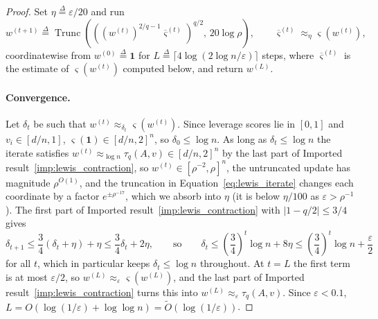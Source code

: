 \documentclass[11pt]{article}
\newcommand{\Trunc}{\operatorname{Trunc}}
\renewcommand{\O}{\widetilde O}
\newcommand{\defeq}{\stackrel{\Delta}{=}}
\begin{document}
\begin{proof}
Set $\eta \defeq \varepsilon / 20$ and run
\begin{equation}
\label{eq:lewis_iterate}
w^{(t + 1)}
\defeq
\Trunc\left(
\left( \left( w^{(t)} \right)^{2/q - 1} \overline{\varsigma}^{(t)} \right)^{q/2},
\, 20 \log \rho \right),
\qquad
\overline{\varsigma}^{(t)} \approx_{\eta} \varsigma\left( w^{(t)} \right),
\end{equation}
coordinatewise from $w^{(0)} \defeq \mathbf{1}$ for
$L \defeq \lceil 4 \log(2 \log n / \varepsilon) \rceil$ steps, where
$\overline{\varsigma}^{(t)}$ is the estimate of
$\varsigma(w^{(t)})$ computed below, and return
$w^{(L)}$.

\paragraph{Convergence.}
Let $\delta_t$ be such that
$w^{(t)} \approx_{\delta_t} \varsigma(w^{(t)})$.
Since leverage scores lie in $[0, 1]$ and
$v_i \in [d/n, 1]$,
$\varsigma(\mathbf{1}) \in [d/n, 2]^{n}$, so
$\delta_0 \le \log n$.
As long as $\delta_t \le \log n$ the iterate satisfies
$w^{(t)} \approx_{\log n} \tau_{q}(A, v) \in [d/n, 2]^{n}$ by the last part of
Imported result~\ref{imp:lewis_contraction}, so
$w^{(t)} \in [\rho^{-2}, \rho]^{n}$, the untruncated update has magnitude
$\rho^{O(1)}$, and the truncation in Equation~\eqref{eq:lewis_iterate} changes
each coordinate by a factor $e^{\pm \rho^{-17}}$, which we absorb into
$\eta$ (it is below
$\eta / 100$ as
$\varepsilon > \rho^{-1}$).
The first part of Imported result~\ref{imp:lewis_contraction} with
$|1 - q/2| \le 3/4$ gives
\[
\delta_{t + 1}
\le
\frac{3}{4} \left( \delta_t + \eta \right) + \eta
\le
\frac{3}{4} \delta_t + 2 \eta ,
\qquad\text{so}\qquad
\delta_t
\le
\left( \frac{3}{4} \right)^{t} \log n + 8 \eta
\le
\left( \frac{3}{4} \right)^{t} \log n + \frac{\varepsilon}{2}
\]
for all $t$, which in particular keeps
$\delta_t \le \log n$ throughout.
At $t = L$ the first term is at most
$\varepsilon / 2$, so
$w^{(L)} \approx_{\varepsilon} \varsigma(w^{(L)})$, and the last part of
Imported result~\ref{imp:lewis_contraction} turns this into
$w^{(L)} \approx_{\varepsilon} \tau_{q}(A, v)$.
Since $\varepsilon < 0.1$,
$L = O(\log(1 / \varepsilon) + \log \log n) = \O(\log(1 / \varepsilon))$.


\end{proof}
\end{document}
